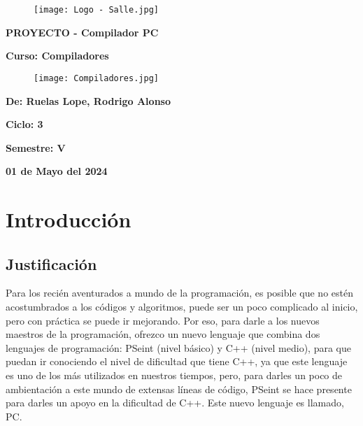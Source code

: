 \documentclass{article}
\begin{document}
\begin{titlepage}
    \centering
    \begin{figure}[htbp]
    \centering
    \texttt{[image: Logo - Salle.jpg]} 
    \label{fig:ejemplo}
    \end{figure}
    
    {\Huge\bfseries PROYECTO - Compilador PC \par}
    \vspace{1.5cm}
    
    {\Large\bfseries Curso: Compiladores \par}
    \vspace{0.5cm}

    \begin{figure}[htbp]
    \centering
    \texttt{[image: Compiladores.jpg]}
    \label{fig:ejemplo}
    \end{figure}
    
    {\Large\bfseries De: Ruelas Lope, Rodrigo Alonso\par}
    {\Large\bfseries Ciclo: 3\par}
    {\Large\bfseries Semestre: V\par}
    {\Large\bfseries 01 de Mayo del 2024\par}
\end{titlepage}

\tableofcontents %

\newpage %

\section{Introducción}
\subsection{Justificación}
Para los recién aventurados a mundo de la programación, es posible que no estén acostumbrados a los códigos y algoritmos, puede ser un poco complicado al inicio, pero con práctica se puede ir mejorando. Por eso, para darle a los nuevos maestros de la programación, ofrezco un nuevo lenguaje que combina dos lenguajes de programación: PSeint (nivel básico) y C++ (nivel medio), para que puedan ir conociendo el nivel de dificultad que tiene C++, ya que este lenguaje es uno de los más utilizados en nuestros tiempos, pero, para darles un poco de ambientación a este mundo de extensas líneas de código, PSeint se hace presente para darles un apoyo en la dificultad de C++. Este nuevo lenguaje es llamado, PC.
\end{document}
